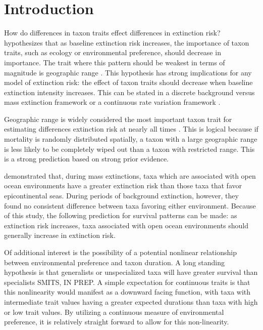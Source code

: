 \documentclass[12pt,letterpaper]{article}
\begin{document}
\section{Introduction}

How do differences in taxon traits effect differences in extinction risk? \citet{Jablonski1987} hypothesizes that as baseline extinction risk increases, the importance of taxon traits, such as ecology or environmental preference, should decrease in importance. The trait where this pattern should be weakest in terms of magnitude is geographic range \citep{Jablonski1987}. This hypothesis has strong implications for any model of extinction risk: the effect of taxon traits should decrease when baseline extinction intensity increases. This can be stated in a discrete background versus mass extinction framework \citep{Jablonski1987} or a continuous rate variation framework \citep{Wang2003}.%

Geographic range is widely considered the most important taxon trait for estimating differences extinction risk at nearly all times \citep{Jablonski1986,Jablonski1987,Jablonski2003,Payne2007}. This is logical because if mortality is randomly distributed spatially, a taxon with a large geographic range is less likely to be completely wiped out than a taxon with restricted range. This is a strong prediction based on strong prior evidence.

\citet{Miller2009a} demonstrated that, during mass extinctions, taxa which are associated with open ocean environments have a greater extinction risk than those taxa that favor epicontinental seas. During periods of background extinction, however, they found no consistent difference between taxa favoring either environment. Because of this study, the following prediction for survival patterns can be made: as extinction risk increases, taxa associated with open ocean environments should generally increase in extinction risk.

Of additional interest is the possibility of a potential nonlinear relationship between environmental preference and taxon duration. A long standing hypothesis is that generalists or unspecialized taxa will have greater survival than specialists \citep{Simpson1944,Liow2004a,Nurnberg2013a,Nurnberg2015,Baumiller1993} \uppercase{Smits, in prep}. A simple expectation for continuous traits is that this nonlinearity would manifest as a downward facing function, with taxa with intermediate trait values having a greater expected durations than taxa with high or low trait values. By utilizing a continuous measure of environmental preference, it is relatively straight forward to allow for this non-linearity.
\end{document}
